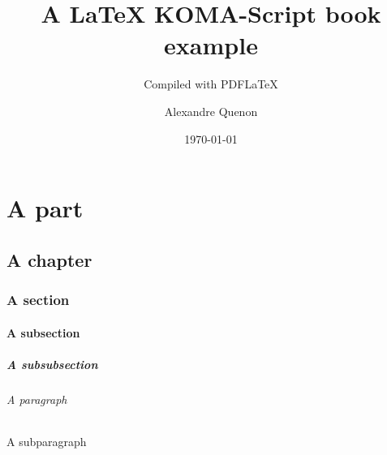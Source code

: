 \documentclass[%
	paper=A4,portrait,%
	fontsize=11pt,%
]{scrbook}
\title{A \LaTeX{} KOMA-Script book example}
\subtitle{Compiled with PDF\LaTeX{}}
\author{Alexandre Quenon}
\date{\today}
\begin{document}

\maketitle


\frontmatter

\tableofcontents


\mainmatter


\part{A part}

	\lipsum


\chapter{A chapter}

	\lipsum[1]


	\section{A section}
	
		\lipsum[2]
		
		
		\subsection{A subsection}
		
			\lipsum[3]
			
			
			\subsubsection{A subsubsection}
			
				\lipsum[4]
				
				
				\paragraph{A paragraph}
				
					\lipsum[5]
					
					
					\subparagraph{A subparagraph}
					
						\lipsum[6]
						
						
						
							\lipsum[7]
	


	\lipsum[1]
	
\end{document}
